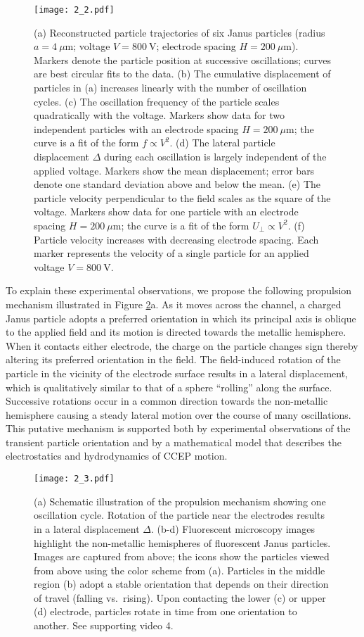\begin{figure}[p]
\centering
\texttt{[image: 2\_2.pdf]}
\caption{(a) Reconstructed particle trajectories of six Janus particles (radius $a = 4~\mu\text{m}$; voltage $V=800~\text{V}$; electrode spacing $H=200~\mu\text{m}$).  Markers denote the particle position at successive oscillations; curves are best circular fits to the data. (b) The cumulative displacement of particles in (a) increases linearly with the number of oscillation cycles. (c) The oscillation frequency of the particle scales quadratically with the voltage.  Markers show data for two independent particles with an electrode spacing $H=200~\mu\text{m}$; the curve is a fit of the form $f\propto V^2$. (d) The lateral particle  displacement $\Delta$ during each oscillation is largely independent of the applied voltage. Markers show the mean displacement; error bars denote one standard deviation above and below the mean. (e) The particle velocity perpendicular to the field scales as the square of the voltage. Markers show data for one particle with an electrode spacing $H=200~\mu\text{m}$; the curve is a fit of the form $U_{\perp}\propto V^2$. (f) Particle velocity increases with decreasing electrode spacing. Each marker represents the velocity of a single particle for an applied voltage $V=800~\text{V}$.}
\label{fig:2}
\end{figure}

To explain these experimental observations, we propose the following propulsion mechanism illustrated in Figure \ref{fig:3}a. 
As it moves across the channel, a charged Janus particle adopts a preferred orientation in which its principal axis is oblique to the applied field and its motion is directed towards the metallic hemisphere.
When it contacts either electrode, the charge on the particle changes sign thereby altering its preferred orientation in the field.
The field-induced rotation of the particle in the vicinity of the electrode surface results in a lateral displacement, which is qualitatively similar to that of a sphere ``rolling'' along the surface.
Successive rotations occur in a common direction towards the non-metallic hemisphere causing a steady lateral motion over the course of many oscillations.
This putative mechanism is supported both by experimental observations of the transient particle orientation and by a mathematical model that describes the electrostatics and hydrodynamics of CCEP motion.

\begin{figure}[p]
\centering
\texttt{[image: 2\_3.pdf]}
\caption{(a) Schematic illustration of the propulsion mechanism showing one oscillation cycle.  Rotation of the particle near the electrodes results in a lateral displacement $\Delta$. (b-d) Fluorescent microscopy images highlight the non-metallic hemispheres of fluorescent Janus particles. Images are captured from above; the icons show the particles viewed from above using the color scheme from (a). Particles in the middle region (b) adopt a stable orientation that depends on their direction of travel (falling vs.~rising). Upon contacting the lower (c) or upper (d) electrode, particles rotate in time from one orientation to another. See supporting video 4.}
\label{fig:3}
\end{figure}

